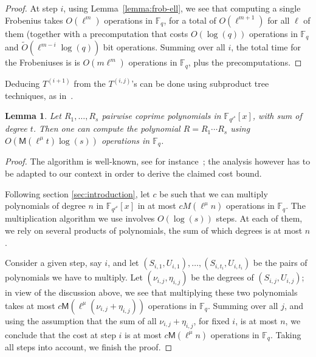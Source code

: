 \documentclass{lms}
\newcommand{\todo}[1]{{\color{red}TODO: #1}}
\newtheorem{lem}[thm]{Lemma}
\newcommand{\F}{\mathbb{F}}
\begin{document}
\begin{proof}
At step $i$, using
Lemma~\ref{lemma:frob-ell}, we see that computing a single Frobenius
takes $O(\ell^m)$ operations in $\F_q$, for a total of $O(\ell^{m+1})$
for all $\ell$ of them (together with a precomputation that costs
$O(\log(q))$ operations in $\F_q$ and $\tilde{O}(\ell^{m-i} \log(q))$
bit operations. Summing over all $i$, the total time for the
Frobeniuses is is $O(m \ell^m)$ operations in $\F_q$, plus the precomputations. 
\end{proof}

Deducing $T^{(i+1)}$ from the $T^{(i,j)}$'s can be done using
subproduct tree techniques, as in~\cite[Chapter~10]{vzGG}. 



\begin{lem} \label{lemma:mul-pol}
  Let $R_1,\dots,R_s$ pairwise coprime polynomials in
  $\F_{q^{\ell^\mu}}[x]$, with sum of degree $t$. Then one can compute the
  polynomial $R=R_1 \cdots R_s$
  using $O(\mathsf{M}(\ell^\mu t) \log(s) )$ operations in $\F_q$.
\end{lem}
\begin{proof}
  The algorithm is well-known, see for
  instance~\cite[Lemma~10.4]{vzGG}; the analysis however has to be
  adapted to our context in order to derive the claimed cost bound.

  Following section \ref{sec:introduction}, let $c$ be such that we can multiply
  polynomials of degree $n$ in $\mathbb{F}_{q^{\ell^\mu}}[x] $ in at
  most $c M(\ell^\mu n)$ operations in $\F_q$. The multiplication
  algorithm we use involves $O(\log(s))$ steps. At each of them, we
  rely on several products of polynomials, the sum of which degrees is
  at most $n$.
  
  Consider a given step, say $i$, and let
  $(S_{i,1},U_{i,1}),\dots,(S_{i,t_i},U_{i,t_i})$ be the pairs of
  polynomials we have to multiply. Let $(\nu_{i,j},\eta_{i,j})$ be the
  degrees of $(S_{i,j},U_{i,j})$; in view of the discussion above, we
  see that multiplying these two polynomials takes at most $c
  \mathsf{M}(\ell^\mu (\nu_{i,j}+\eta_{i,j}))$ operations in
  $\F_q$. Summing over all $j$, and using the assumption that the sum
  of all $\nu_{i,j}+\eta_{i,j}$, for fixed $i$, is at most $n$, we
  conclude that the cost at step $i$ is at most $c \mathsf{M}(\ell^\mu
  n)$ operations in $\F_q$. Taking all steps into account, we finish
  the proof.
\end{proof}
\end{document}
